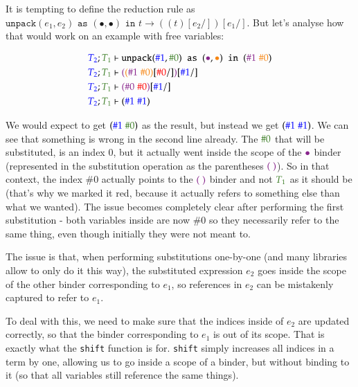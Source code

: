 \documentclass[runningheads]{article}
\begin{document}
It is tempting to define the reduction rule as $\texttt{unpack} (e_1, e_2) \texttt{ as } (\bullet, \bullet) \texttt{ in } t \longrightarrow ((t)[e_2/])[e_1/]$. But let's analyse how that would work on an example with free variables:

\begin{align*}
{\color{blue}T_2}; {\color{OliveGreen}T_1} &\vdash \texttt{unpack} ({\color{blue}\#1}, {\color{OliveGreen}\#0}) \texttt{ as } ({\color{Fuchsia}\bullet}, {\color{BurntOrange}\bullet}) \texttt{ in } ({\color{Fuchsia}\#1} \; {\color{BurntOrange}\#0}) \\
{\color{blue}T_2}; {\color{OliveGreen}T_1} &\vdash {\color{Fuchsia}(}{\color{BurntOrange}({\color{Fuchsia}\#1} \; {\color{BurntOrange}\#0})}[{\color{red}\#0}/]{\color{Fuchsia})}[{\color{blue}\#1}/] \\
{\color{blue}T_2}; {\color{OliveGreen}T_1} &\vdash {\color{Fuchsia}(}{\color{Fuchsia}\#0} \; {\color{red}\#0}{\color{Fuchsia})}[{\color{blue}\#1}/] \\
{\color{blue}T_2}; {\color{OliveGreen}T_1} &\vdash ({\color{blue}\#1} \; {\color{blue}\#1})
\end{align*}

We would expect to get $({\color{blue}\#1} \; {\color{OliveGreen}\#0})$ as the result, but instead we get $({\color{blue}\#1} \; {\color{blue}\#1})$. We can see that something is wrong in the second line already. The ${\color{OliveGreen}\#0}$ that will be substituted, is an index 0, but it actually went inside the scope of the ${\color{Fuchsia}\bullet}$ binder (represented in the substitution operation as the parentheses ${\color{Fuchsia}( \; )}$). So in that context, the index $\#0$ actually points to the ${\color{Fuchsia}( \; )}$ binder and not ${\color{OliveGreen}T_1}$ as it should be (that's why we marked it {\color{red}red}, because it actually refers to something else than what we wanted). The issue becomes completely clear after performing the first substitution - both variables inside are now $\#0$ so they necessarily refer to the same thing, even though initially they were not meant to.

The issue is that, when performing substitutions one-by-one (and many libraries allow to only do it this way), the substituted expression $e_2$ goes inside the scope of the other binder corresponding to $e_1$, so references in $e_2$ can be mistakenly captured to refer to $e_1$.

To deal with this, we need to make sure that the indices inside of $e_2$ are updated correctly, so that the binder corresponding to $e_1$ is out of its scope. That is exactly what the \texttt{shift} function is for. \texttt{shift} simply increases all indices in a term by one, allowing us to go inside a scope of a binder, but without binding to it (so that all variables still reference the same things).
\end{document}
